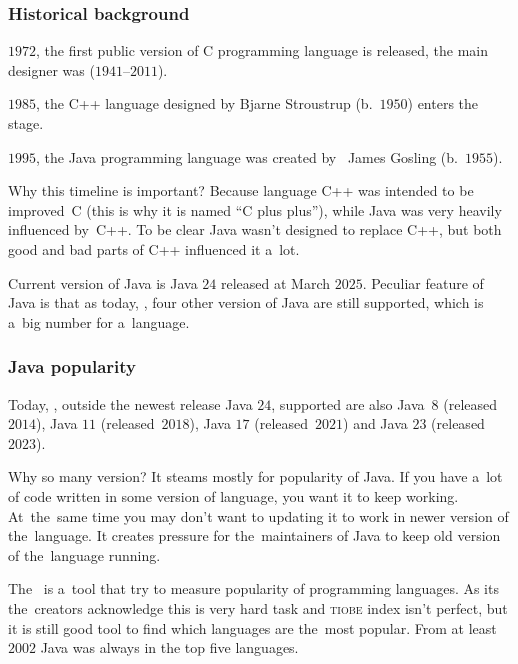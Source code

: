 \documentclass[10pt,t]{beamer}
\begin{document}
\begin{frame}
  \frametitle{Historical background}


  $1972$, the first public version of C programming language is released,
  the main designer was
  ($1941\text{--}2011$).

  $1985$, the C++ language designed by
  {Bjarne Stroustrup} (b.~$1950$) enters the stage.

  $1995$, the Java programming language was created
  by~
  {James Gosling} (b.~$1955$).

  Why this timeline is important? Because language C++ was intended to be
  improved~C (this is why it is named ``C plus plus''), while Java was very
  heavily influenced by~C++. To be clear Java \alert{wasn't} designed to
  replace C++, but both good and bad parts of C++ influenced it
  a~lot.

  Current version of Java is Java $24$ released at March $2025$. Peculiar
  feature of Java is that as today, \currentYear, four other version of Java
  are still supported, which is a~big number for a~language.

\end{frame}





\begin{frame}
  \frametitle{Java popularity}


  Today, \currentYear, outside the newest release Java $24$, supported are
  also Java~$8$ (released~$2014$), Java $11$ (released~$2018$), Java $17$
  (released~$2021$) and Java $23$ (released~$2023$).

  Why so many version? It steams mostly for popularity of Java. If you have
  a~lot of code written in some version of language, you want it to keep
  working. At~the~same time you may don't want to updating it to work in
  newer version of the~language. It creates pressure for the~maintainers of
  Java to keep old version of the~language running.

  The~ is a~tool that try to measure popularity of
  programming languages. As its the~creators acknowledge this is very hard
  task and \textsc{tiobe} index isn't perfect, but it is still good tool to
  find which languages are the~most popular. From at least $2002$ Java was
  always in the top five languages.

\end{frame}
\end{document}
